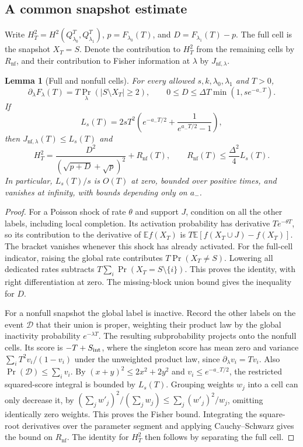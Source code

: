 \documentclass[11pt]{article}
\newtheorem{lemma}{Lemma}
\begin{document}
\subsection{A common snapshot estimate}\label{common-snapshot-estimate}

Write \(H_T^2=H^2(Q_{\lambda_0}^T,Q_{\lambda_1}^T)\), \(p=F_{\lambda_0}(T)\), and \(D=F_{\lambda_1}(T)-p\). The full cell is the snapshot \(X_T=S\). Denote the contribution to \(H_T^2\) from the remaining cells by \(R_{\mathrm{nf}}\), and their contribution to Fisher information at \(\lambda\) by \(J_{\mathrm{nf},\lambda}\).

\begin{lemma}[Full and nonfull cells]\label{lem:snapshot}
For every allowed \(s,k,\lambda_0,\lambda_1\) and \(T>0\),
\[
\partial_\lambda F_\lambda(T)=T\Pr_\lambda(|S\setminus X_T|\ge2),
\qquad
0\le D\le\Delta T\min(1,se^{-a_-T}).
\tag{2}\label{eq:balance}
\]
If
\[
L_s(T)=2sT^2\left(e^{-a_-T/2}+\frac1{e^{a_-T/2}-1}\right),
\tag{3}\label{eq:nonfull}
\]
then \(J_{\mathrm{nf},\lambda}(T)\le L_s(T)\) and
\[
H_T^2=\frac{D^2}{(\sqrt{p+D}+\sqrt p)^2}+R_{\mathrm{nf}}(T),
\qquad
R_{\mathrm{nf}}(T)\le\frac{\Delta^2}{4}L_s(T).
\tag{4}\label{eq:split}
\]
In particular, \(L_s(T)/s\) is \(O(T)\) at zero, bounded over positive times, and vanishes at infinity, with bounds depending only on \(a_-\).
\end{lemma}

\begin{proof}
For a Poisson shock of rate \(\theta\) and support \(J\), condition on all the other labels, including local completion. Its activation probability has derivative \(Te^{-\theta T}\), so its contribution to the derivative of \(\mathbb E f(X_T)\) is \(T\mathbb E[f(X_T\cup J)-f(X_T)]\). The bracket vanishes whenever this shock has already activated. For the full-cell indicator, raising the global rate contributes \(T\Pr(X_T\ne S)\). Lowering all dedicated rates subtracts \(T\sum_i\Pr(X_T=S\setminus\{i\})\). This proves the identity, with right differentiation at zero. The missing-block union bound gives the inequality for \(D\).

For a nonfull snapshot the global label is inactive. Record the other labels on the event \(\mathcal D\) that their union is proper, weighting their product law by the global inactivity probability \(e^{-\lambda T}\). The resulting subprobability projects onto the nonfull cells. Its score is \(-T+S_{\rm int}\), where the singleton score has mean zero and variance \(\sum_i T^2v_i/(1-v_i)\) under the unweighted product law, since \(\partial_\lambda v_i=Tv_i\). Also \(\Pr(\mathcal D)\le\sum_i v_i\). By \((x+y)^2\le2x^2+2y^2\) and \(v_i\le e^{-a_-T/2}\), the restricted squared-score integral is bounded by \(L_s(T)\). Grouping weights \(w_j\) into a cell can only decrease it, by \((\sum_j w'_j)^2/(\sum_j w_j)\le\sum_j (w'_j)^2/w_j\), omitting identically zero weights. This proves the Fisher bound. Integrating the square-root derivatives over the parameter segment and applying Cauchy--Schwarz gives the bound on \(R_{\mathrm{nf}}\). The identity for \(H_T^2\) then follows by separating the full cell.
\end{proof}
\end{document}
